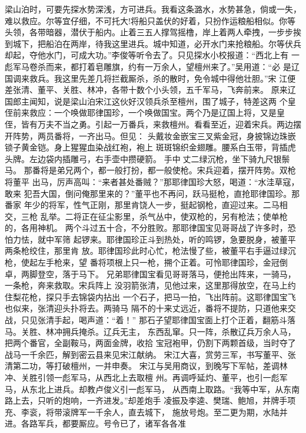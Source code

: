 梁山泊时，可要先探水势深浅，方可进兵。我看这条潞水，水势甚急，倘或一失，
难以救应。尔等宜仔细，不可托大!将船只盖伏的好着，只扮作运粮船相似。你等
头领，各带暗器，潜伏于船内。止着三五人撑驾摇橹，岸上着两人牵拽，一步步挨
到城下，把船泊在两岸，待我这里进兵。城中知道，必开水门来抢粮船。尔等伏兵
却起，夺他水门，可成大功。”李俊等听令去了。只见探水小校报道：“西北上有
一彪军马卷杀而来，都打着皂雕旗，约有一万余人，望檀州来了。”吴用道：“必
是辽国调来救兵。我这里先差几将拦截厮杀，杀的散时，免令城中得他壮胆。”宋
江便差张清、董平、关胜、林冲，各带十数个小头领，五千军马，飞奔前来。
原来辽国郎主闻知，说是梁山泊宋江这伙好汉领兵杀至檀州，围了城子，特差这两
个皇侄前来救应：一个唤做耶律国珍，一个唤做国宝。两个乃是辽国上将，又是皇
侄，皆有万夫不当之勇。引起一万番兵，来救檀州。看看至近，迎着宋兵。两边摆
开阵势，两员番将，一齐出马。但见：
头戴妆金嵌宝三叉紫金冠，身披锦边珠嵌锁子黄金铠。身上猩猩血染战红袍，袍上
斑斑锦织金翅雕。腰系白玉带，背插虎头牌。左边袋内插雕弓，右手壶中攒硬箭。
手中丈二绿沉枪，坐下骑九尺银鬃马。
那番将是弟兄两个，都一般打扮，都一般使枪。宋兵迎着，摆开阵势。双枪将董平
出马，厉声高叫：“来者甚处番贼？”那耶律国珍大怒，喝道：“水洼草寇，敢来
犯吾大国，倒问俺那里来的？”董平也不再问，跃马挺枪，直抢耶律国珍。那番家
年少的将军，性气正刚，那里肯饶人一步，挺起钢枪，直迎过来。二马相交，三枪
乱举。二将正在征尘影里，杀气丛中，使双枪的，另有枪法；使单枪的，各用神机。
两个斗过五十合，不分胜败。那耶律国宝见哥哥战了许多时，恐怕力怯，就中军筛
起锣来。耶律国珍正斗到热处，听的鸣锣，急要脱身，被董平两条枪绞住，那里肯
放。耶律国珍此时心忙，枪法慢了些，被董平右手逼过绿沉枪，使起左手枪来，望
番将项根上只一枪，搠个正着。可怜耶律国珍，金冠倒卓，两脚登空，落于马下。
兄弟耶律国宝看见哥哥落马，便抢出阵来，一骑马，一条枪，奔来救取。宋兵阵上
没羽箭张清，见他过来，这里那得放空，在马上约住梨花枪，探只手去锦袋内拈出
一个石子，把马一拍，飞出阵前。这耶律国宝飞也似来，张清迎头扑将去。两骑马
隔不的十来丈远近，番将不提防，只道他来交战，只见张清手起，喝声道：“着！”
那石子望耶律国宝面上打个正着，翻筋斗落马。关胜、林冲拥兵掩杀。辽兵无主，
东西乱窜。只一阵，杀散辽兵万余人马，把两个番官，全副鞍马，两面金牌，收拾
宝冠袍甲，仍割下两颗首级，当时夺了战马一千余匹，解到密云县来见宋江献纳。
宋江大喜，赏劳三军，书写董平、张清第二功，等打破檀州，一并申奏。
宋江与吴用商议，到晚写下军帖，差调林冲、关胜引领一彪军马，从西北上去取檀
州。再调呼延灼、董平，也引一彪军马，从东北上进兵。却教卢俊义引一彪军马，
从西南上取路。“我等中军，从东南路上去，只听的炮响，一齐进发。”却差炮手
凌振及李逵、樊瑞、鲍旭，并牌手项充、李衮，将带滚牌军一千余人，直去城下，
施放号炮。至二更为期，水陆并进。各路军兵，都要厮应。号令已了，诸军各各准
